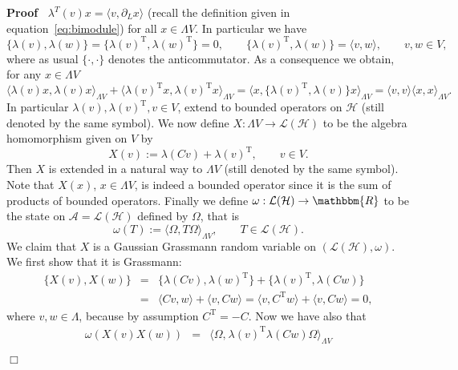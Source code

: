 \documentclass[11pt]{article}
\newcommand{\Tau}{\mathrm{T}}
\newcommand{\assign}{:=}
\newenvironment{proof}{\noindent\textbf{Proof\ }}{\hspace*{\fill}$\Box$\medskip}
\begin{document}
\begin{proof}
  $\lambda^T (v) x = \langle v, \partial_L x \rangle$ (recall the definition
  given in equation~{\eqref{eq:bimodule}}) for all $x \in \Lambda V$. In
  particular we have
  \begin{equation}
    \{ \lambda (v), \lambda (w) \} = \{ \lambda (v)^{\Tau}, \lambda (w)^{\Tau}
    \} = 0, \qquad \{ \lambda (v)^{\Tau}, \lambda (w) \} = \langle v, w
    \rangle, \qquad v, w \in V, \label{eq:car}
  \end{equation}
  where as usual $\{ \cdot, \cdot \}$ denotes the anticommutator. As a
  consequence we obtain, for any $x \in \Lambda V$
  \[ \langle \lambda (v) x, \lambda (v) x \rangle_{\Lambda V} + \langle
     \lambda (v)^{\Tau} x, \lambda (v)^{\Tau} x \rangle_{\Lambda V} = \langle
     x, \{ \lambda (v)^{\Tau}, \lambda (v) \} x \rangle_{\Lambda V} = \langle
     v, v \rangle \langle x, x \rangle_{\Lambda V} . \]
  In particular $\lambda (v), \lambda (v)^{\Tau}, v \in V$, extend to bounded
  operators on $\mathcal{H}$ (still denoted by the same symbol). We now define
  $X : \Lambda V \rightarrow \mathcal{L} (\mathcal{H})$ to be the algebra
  homomorphism given on $V$ by
  \[ X (v) \assign \lambda (C v) + \lambda (v)^{\Tau}, \qquad v \in V. \]
  Then $X$ is extended in a natural way to $\Lambda V$ (still denoted by the
  same symbol). Note that $X (x)$, $x \in \Lambda V$, is indeed a bounded
  operator since it is the sum of products of bounded operators. Finally we
  define $\omega : \mathcal{L} (\mathcal{H}) \rightarrow \mathbbm{R}$ to be the
  state on $\mathcal{A} =\mathcal{L} (\mathcal{H})$ defined by $\Omega$, that
  is
  \[ \omega (T) \assign \langle \Omega, T \Omega \rangle_{\Lambda V}, \qquad T
     \in \mathcal{L} (\mathcal{H}) . \]
  We claim that $X$ is a Gaussian Grassmann random variable on $(\mathcal{L}
  (\mathcal{H}), \omega)$. We first show that it is Grassmann:
  \[ \begin{array}{lll}
       \{ X (v), X (w) \} & = & \{ \lambda (C v), \lambda (w)^{\Tau} \} + \{
       \lambda (v)^{\Tau}, \lambda (C w) \}\\
       & = & \langle C v, w \rangle + \langle v, C w \rangle = \langle v,
       C^{\Tau} w \rangle + \langle v, C w \rangle = 0,
     \end{array} \]
  where $v, w \in \Lambda$, because by assumption $C^{\Tau} = - C$. Now we
  have also that
  \begin{eqnarray*}
    \omega (X (v) X (w)) & = & \langle \Omega,^{} \lambda (v)^{\Tau} \lambda
    (C w) \Omega \rangle_{\Lambda V}\\

\end{eqnarray*}
\end{proof}
\end{document}
